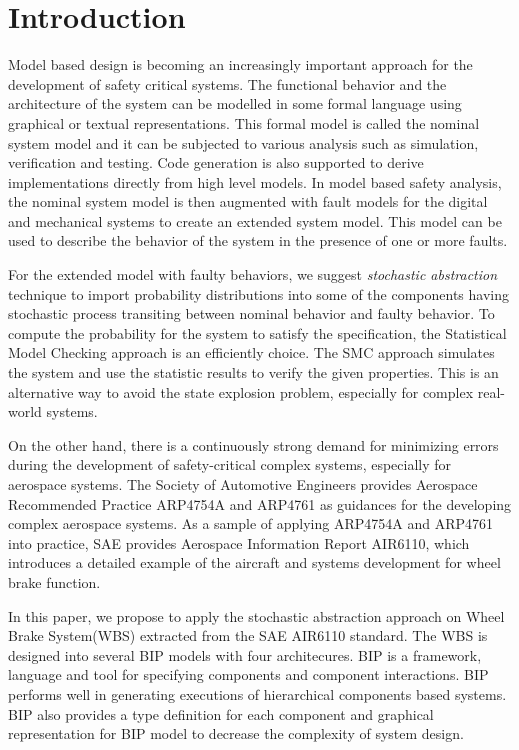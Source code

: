 
\section{Introduction}

Model based design is becoming an increasingly important approach for the development of safety critical systems.
The functional behavior and the architecture of the system can be modelled in some formal language using graphical or textual representations.
This formal model is called the nominal system model and it can be subjected to various analysis such as simulation, verification and testing.
Code generation is also supported to derive implementations directly from high level models.
In model based safety analysis, the nominal system model is then augmented with fault models for the digital and mechanical systems to create an extended system model.
This model can be used to describe the behavior of the system in the presence of one or more faults.


For the extended model with faulty behaviors, we suggest \emph{stochastic abstraction}\cite{stoabs} technique to import probability distributions into some of the components having stochastic process transiting between nominal behavior and faulty behavior.
To compute the probability for the system to satisfy the specification, the Statistical Model Checking\cite{vmcai04}\cite{cav04}\cite{cmu04} approach is an efficiently choice. The SMC approach simulates the system and use the statistic results to verify the given properties.
This is an alternative way to avoid the state explosion problem, especially for complex real-world systems.

On the other hand, there is a continuously strong demand for minimizing errors during the development of safety-critical complex systems\cite{lctes10}, especially for aerospace systems\cite{issrew12}.
The Society of Automotive Engineers provides Aerospace Recommended Practice ARP4754A\cite{arp4754a} and ARP4761\cite{arp4761} as guidances for the developing complex aerospace systems. As a sample of applying ARP4754A and ARP4761 into practice, SAE provides Aerospace Information Report AIR6110\cite{air6110}, which introduces a detailed example of the aircraft and systems development for wheel brake function.

In this paper, we propose to apply the stochastic abstraction approach on Wheel Brake System(WBS) extracted from the SAE AIR6110 standard. The WBS is designed into several BIP models with four architecures. BIP is a framework, language and tool for specifying components and component interactions. BIP performs well in generating executions of hierarchical components based systems. BIP also provides a type definition for each component and graphical representation for BIP model to decrease the complexity of system design.

